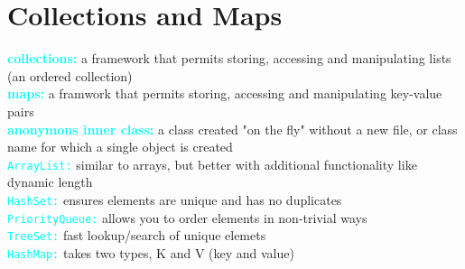 \documentclass[a4paper,10pt]{article}
\begin{document}
\section{Collections and Maps}
\textcolor{Cyan}{\textbf{collections: }} a framework that permits storing, accessing and manipulating lists (an ordered collection) \\ 
\textcolor{Cyan}{\textbf{maps: }} a framwork that permits storing, accessing and manipulating key-value pairs \\ 
\textcolor{Cyan}{\textbf{anonymous inner class:}} a class created "on the fly" without a new file, or class name for which a single object is created \\
\textcolor{Cyan}{\texttt{ArrayList:}} similar to arrays, but better with additional functionality like dynamic length \\
\textcolor{Cyan}{\texttt{HashSet:}} ensures elements are unique and has no duplicates \\
\textcolor{Cyan}{\texttt{PriorityQueue:}} allows you to order elements in non-trivial ways \\ 
\textcolor{Cyan}{\texttt{TreeSet:}} fast lookup/search of unique elemets \\
\textcolor{Cyan}{\texttt{HashMap:}} takes two types, K and V (key and value) \\ 

\newpage
\end{document}
